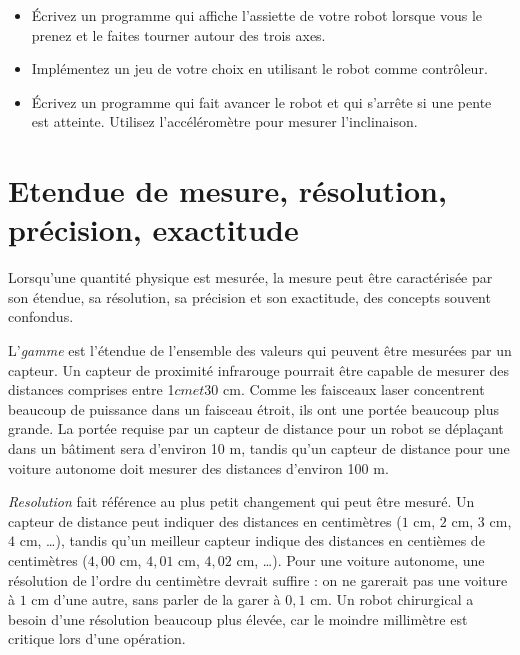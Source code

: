 \begin{framed}

\begin{itemize}
\item Écrivez un programme qui affiche l'assiette de votre robot lorsque vous le prenez et le faites tourner autour des trois axes.

\item Implémentez un jeu de votre choix en utilisant le robot comme contrôleur.

\item Écrivez un programme qui fait avancer le robot et qui s'arrête si une pente est atteinte. Utilisez l'accéléromètre pour mesurer l'inclinaison.
\end{itemize}
\end{framed}

\section{Etendue de mesure, résolution, précision, exactitude}\label{s.range}

Lorsqu'une quantité physique est mesurée, la mesure peut être caractérisée par son étendue, sa résolution, sa précision et son exactitude, des concepts souvent confondus.

L'\emph{gamme} est l'étendue de l'ensemble des valeurs qui peuvent être mesurées par un capteur. Un capteur de proximité infrarouge pourrait être capable de mesurer des distances comprises entre 1$ cm et 30$ cm. Comme les faisceaux laser concentrent beaucoup de puissance dans un faisceau étroit, ils ont une portée beaucoup plus grande. La portée requise par un capteur de distance pour un robot se déplaçant dans un bâtiment sera d'environ 10 m, tandis qu'un capteur de distance pour une voiture autonome doit mesurer des distances d'environ 100 m.

\emph{Resolution} fait référence au plus petit changement qui peut être mesuré. Un capteur de distance peut indiquer des distances en centimètres ($1$ cm, $2$ cm, $3$ cm, $4$ cm, \ldots), tandis qu'un meilleur capteur indique des distances en centièmes de centimètres ($4,00$ cm, $4,01$ cm, $4,02$ cm, \ldots). Pour une voiture autonome, une résolution de l'ordre du centimètre devrait suffire : on ne garerait pas une voiture à $1$ cm d'une autre, sans parler de la garer à $0,1$ cm. Un robot chirurgical a besoin d'une résolution beaucoup plus élevée, car le moindre millimètre est critique lors d'une opération.

